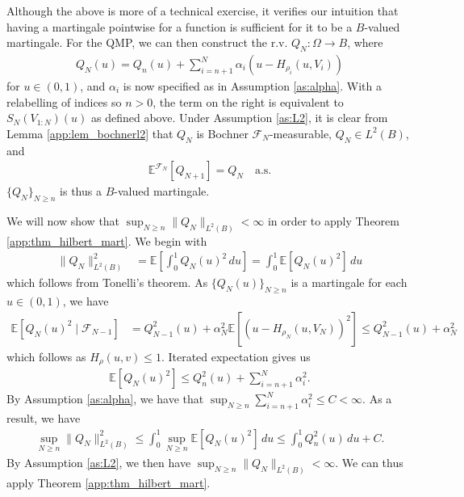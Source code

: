 \documentclass[11pt,a4paper]{article}
\newcommand{\E}{\mathbb{E}}
\begin{document}
\begin{appendices}
Although the above is more of a technical exercise, it verifies our intuition that having a martingale pointwise for a function is sufficient for it to be a $B$-valued martingale. For the QMP, we can then construct the r.v. $Q_N: \Omega \to B$, where 
\begin{align}\label{app:eq_relab}
    Q_N(u) = Q_n(u) + \sum_{i = n+1}^N \alpha_i (u - H_{\rho_i}(u,V_i))
\end{align}
for $u \in (0,1)$, and $\alpha_i$ is now specified as in {Assumption \ref{as:alpha}}. With a relabelling of indices so $n > 0$, the term on the right is equivalent to $S_N(V_{1:N})(u)$ as defined above. Under {Assumption \ref{as:L2}}, it is clear from {Lemma \ref{app:lem_bochnerl2}} that $Q_N$ is Bochner $\mathcal{F}_N$-measurable, $Q_N \in L^2(B)$, and
\begin{align*}
    \E^{\mathcal{F}_N}[Q_{N+1}] = Q_N \quad \text{a.s.}
\end{align*}
 $\{Q_N\}_{N \geq n}$  is thus a $B$-valued martingale. 
 
 We will now show that $\sup_{N \geq n} \|Q_N\|_{L^2(B)} < \infty$ in order to apply {Theorem \ref{app:thm_hilbert_mart}}. We begin with
\begin{align*}
    \|Q_N\|^2_{L^2(B)}  &= \E\left[\int_0^1 Q_N(u)^2\, du\right]=\int_0^1\E\left[Q_N(u)^2\right]\, du
\end{align*}
which follows from Tonelli's theorem. As $\{Q_N(u)\}_{N \geq n}$ is a martingale for each $u\in (0,1)$, we have
\begin{align*}
   \E[Q_N(u)^2 \mid \mathcal{F}_{N-1}] &= Q_{N-1}^2(u) + \alpha_N^2\E\left[ \left(u - H_{\rho_N}\left(u,V_N\right)\right)^2\right]\leq Q_{N-1}^2(u) + \alpha_N^2
\end{align*}
which follows as $H_\rho(u,v) \leq 1$. Iterated expectation gives us 
\begin{align*}
   \E[Q_N(u)^2 ] \leq Q_n^2(u) + \sum_{i = n+1}^N \alpha_i^2.
\end{align*}
By {Assumption \ref{as:alpha}}, we have that $\sup_{N\geq n} \sum_{i = n+1}^N \alpha_i^2 \leq C < \infty$. As a result, we have
\begin{align*}
    \sup_{N\geq n}  \|Q_N\|^2_{L^2(B)}  \leq \int_0^1 \sup_{N\geq n} \E\left[Q_N(u)^2\right]\,du \leq \int_0^1 Q_n^2(u) \,du + C.
\end{align*}
By {Assumption \ref{as:L2}}, we then have $\sup_{N \geq n}  \|Q_N\|_{L^2(B)} < \infty$. We can thus apply {Theorem \ref{app:thm_hilbert_mart}}. 


\end{appendices}
\end{document}
